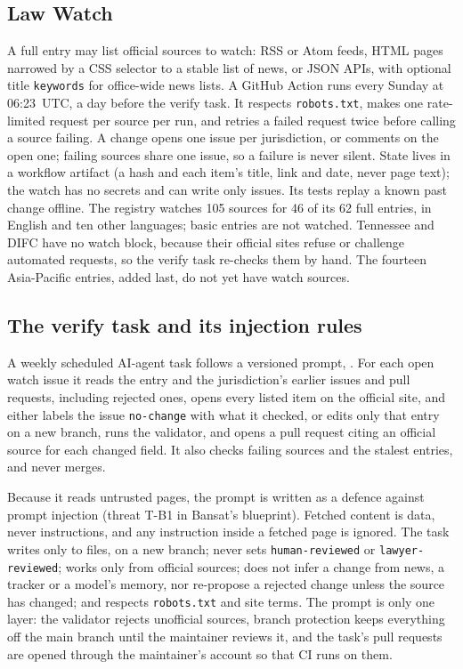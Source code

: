 \documentclass[11pt,a4paper]{article}
\DeclareRobustCommand{\fpath}[1]{\path{#1}}
\begin{document}
\subsection{Law Watch}
A full entry may list official sources to watch: RSS or Atom feeds, HTML pages narrowed by a CSS selector to a stable
list of news, or JSON APIs, with optional title \texttt{keywords} for office-wide news lists. A GitHub Action runs every Sunday at 06:23~UTC, a day
before the verify task. It respects \texttt{robots.txt}, makes one rate-limited request per source per run, and retries a
failed request twice before calling a source failing. A change opens one issue per jurisdiction, or comments on the open
one; failing sources share one issue, so a failure is never silent. State lives in a workflow artifact (a hash and each
item's title, link and date, never page text); the watch has no secrets and can write only issues. Its tests replay a known past change offline. The registry watches 105 sources for 46 of
its 62 full entries, in English and ten other languages; basic entries are not watched. Tennessee and DIFC have no watch
block, because their official sites refuse or challenge automated requests, so the verify task re-checks them by hand. The
fourteen Asia-Pacific entries, added last, do not yet have watch sources.

\subsection{The verify task and its injection rules}\label{sec:verify}
A weekly scheduled AI-agent task follows a versioned prompt, \fpath{watch/verify-prompt.md}. For each open watch issue
it reads the entry and the jurisdiction's earlier issues and pull requests, including rejected ones, opens every listed
item on the official site, and either labels the issue \texttt{no-change} with what it checked, or edits only that entry
on a new branch, runs the validator, and opens a pull request citing an official source for each changed field. It
also checks failing sources and the stalest entries, and never merges.

Because it reads untrusted pages, the prompt is written as a defence against prompt injection (threat T-B1 in Bansat's
blueprint). Fetched content is data, never instructions, and any instruction inside a fetched page is ignored. The task
writes only to \fpath{laws/} files, on a new branch; never sets \texttt{human-reviewed} or \texttt{lawyer-reviewed};
works only from official sources; does not infer a change from news, a tracker or a model's memory, nor re-propose a
rejected change unless the source has changed; and respects \texttt{robots.txt} and site terms. The prompt is only
one layer: the validator rejects unofficial sources, branch protection keeps everything off the main branch until the
maintainer reviews it, and the task's pull requests are opened through the maintainer's account so that CI runs on them.
\end{document}
